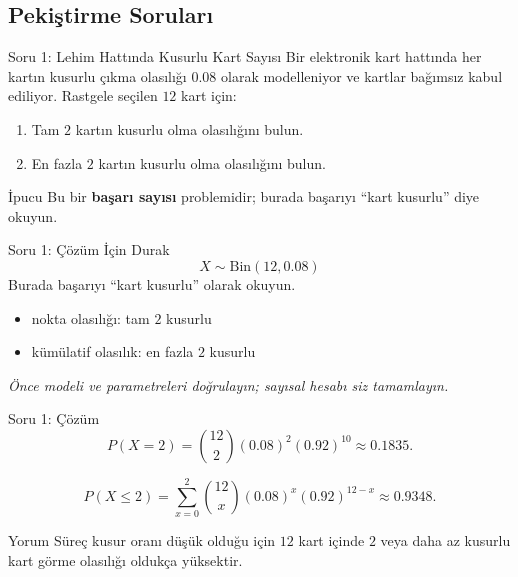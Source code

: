 \documentclass[light]{lutbeamer}
\begin{document}
\subsection{Pekiştirme Soruları}

\begin{frame}{Soru 1: Lehim Hattında Kusurlu Kart Sayısı}
    \small
    Bir elektronik kart hattında her kartın kusurlu çıkma olasılığı \(0.08\) olarak modelleniyor ve kartlar bağımsız kabul ediliyor. Rastgele seçilen \(12\) kart için:

    \begin{enumerate}
        \item[(a)] Tam \(2\) kartın kusurlu olma olasılığını bulun.
        \item[(b)] En fazla \(2\) kartın kusurlu olma olasılığını bulun.
    \end{enumerate}

    \begin{block}{İpucu}
        Bu bir \textbf{başarı sayısı} problemidir; burada başarıyı ``kart kusurlu'' diye okuyun.
    \end{block}
\end{frame}

\begin{frame}{Soru 1: Çözüm İçin Durak}
    \color{red!70!black}
    \small
    \[
    X \sim \mathrm{Bin}(12,0.08)
    \]
    Burada başarıyı ``kart kusurlu'' olarak okuyun.
    \begin{itemize}
        \item[(a)] nokta olasılığı: tam \(2\) kusurlu
        \item[(b)] kümülatif olasılık: en fazla \(2\) kusurlu
    \end{itemize}

    \begin{center}
        \textit{Önce modeli ve parametreleri doğrulayın; sayısal hesabı siz tamamlayın.}
    \end{center}
\end{frame}

\begin{frame}{Soru 1: Çözüm}
    \small
    \[
    P(X=2)=\binom{12}{2}(0.08)^2(0.92)^{10}\approx 0.1835.
    \]

    \[
    P(X\le 2)=\sum_{x=0}^{2}\binom{12}{x}(0.08)^x(0.92)^{12-x}\approx 0.9348.
    \]

    \begin{exampleblock}{Yorum}
        Süreç kusur oranı düşük olduğu için \(12\) kart içinde \(2\) veya daha az kusurlu kart görme olasılığı oldukça yüksektir.
    \end{exampleblock}
\end{frame}
\end{document}
